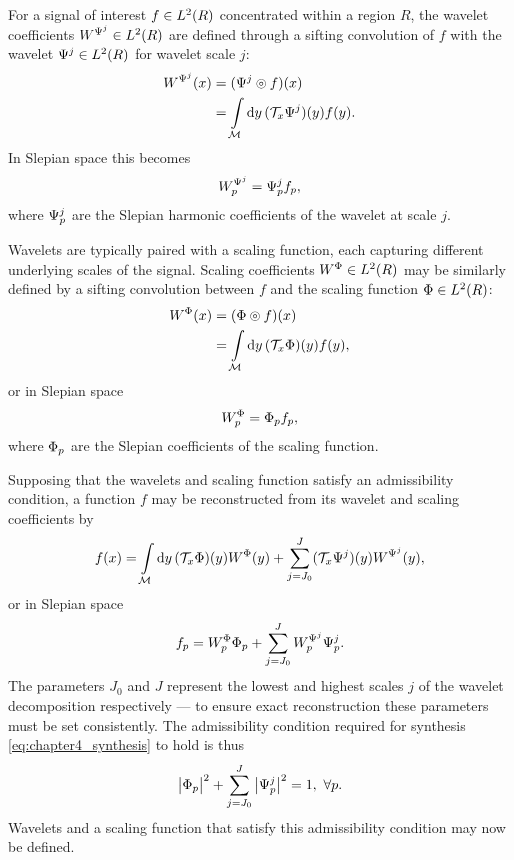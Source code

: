 For a signal of interest \(f \in L^{2}(R)\) concentrated within a region \(R\), the wavelet coefficients \(W^{\Psi^{j}} \in L^{2}(R)\) are defined through a sifting convolution of \(f\) with the wavelet \(\Psi^{j} \in L^{2}(R)\) for wavelet scale \(j\):
%
\begin{align}
	W^{\Psi^{j}}(x)
	 & = (\Psi^{j} \circledcirc{} f)(x) \nonumber                         \\
	 & = \int\limits_{\mathcal{M}} \dd{y} (\mathcal{T}_{x}\Psi^{j})(y) f(y).
\end{align}
%
In Slepian space this becomes
%
\begin{equation}\label{eq:chapter4_slepian_wavelet_p}
	{W}_{p}^{\Psi^{j}}
	= {\Psi}_{p}^{j} {f}_{p},
\end{equation}
%
where \({\Psi}_{p}^{j}\) are the Slepian harmonic coefficients of the wavelet at scale \(j\).

Wavelets are typically paired with a scaling function, each capturing different underlying scales of the signal.
Scaling coefficients \(W^{\Phi} \in L^{2}(R)\) may be similarly defined by a sifting convolution between \(f\) and the scaling function \(\Phi \in L^{2}(R)\):
%
\begin{align}
	W^{\Phi}(x)
	 & = (\Phi \circledcirc{} f)(x) \nonumber                         \\
	 & = \int\limits_{\mathcal{M}} \dd{y} (\mathcal{T}_{x}\Phi)(y) f(y),
\end{align}
%
or in Slepian space
%
\begin{equation}\label{eq:chapter4_slepian_scaling_p}
	{W}_{p}^{\Phi}
	= {\Phi}_{p} {f}_{p},
\end{equation}
%
where \({\Phi}_{p}\) are the Slepian coefficients of the scaling function.

Supposing that the wavelets and scaling function satisfy an admissibility condition, a function \(f\) may be reconstructed from its wavelet and scaling coefficients by
%
\begin{equation}\label{eq:chapter4_synthesis}
	f(x)
	= \int\limits_{\mathcal{M}} \dd{y}
	(\mathcal{T}_{x}\Phi)(y) W^{\Phi}(y)
	+ \sum\limits_{j=J_{0}}^{J} (\mathcal{T}_{x}\Psi^{j})(y) W^{\Psi^{j}}(y),
\end{equation}
%
or in Slepian space
%
\begin{equation}
	{f}_{p}
	= {W}_{p}^{\Phi} {\Phi}_{p}
	+ \sum\limits_{j=J_{0}}^{J} {W}_{p}^{\Psi^{j}} {\Psi}_{p}^{j}.
\end{equation}
%
The parameters \(J_{0}\) and \(J\) represent the lowest and highest scales \(j\) of the wavelet decomposition respectively --- to ensure exact reconstruction these parameters must be set consistently.
The admissibility condition required for synthesis \cref{eq:chapter4_synthesis} to hold is thus
%
\begin{equation}\label{eq:chapter4_admissibility}
	\big\lvert{\Phi}_{p}\big\rvert^{2}
	+ \sum\limits_{j=J_{0}}^{J} \big\lvert{\Psi}_{p}^{j}\big\rvert^{2}
	= 1,\ \forall p.
\end{equation}
%
Wavelets and a scaling function that satisfy this admissibility condition may now be defined.

